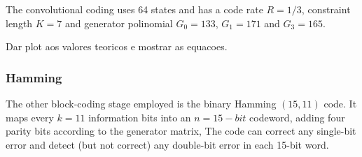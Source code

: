 The convolutional coding uses 64 states and has a code rate $R = 1/3$, constraint length $K = 7$ and generator polinomial $G_0 = 133$, $G_1=171$ and $G_3 = 165$. 


Dar plot aos valores teoricos e mostrar as equacoes.

\subsubsection{Hamming}

The other block-coding stage employed is the binary Hamming $(15,11)$ code. It maps every $k=11$ information bits into an $n=15-bit$ codeword, adding four parity bits according to the generator matrix, The code can correct any single-bit error and detect (but not correct) any double-bit error in each 15-bit word.

